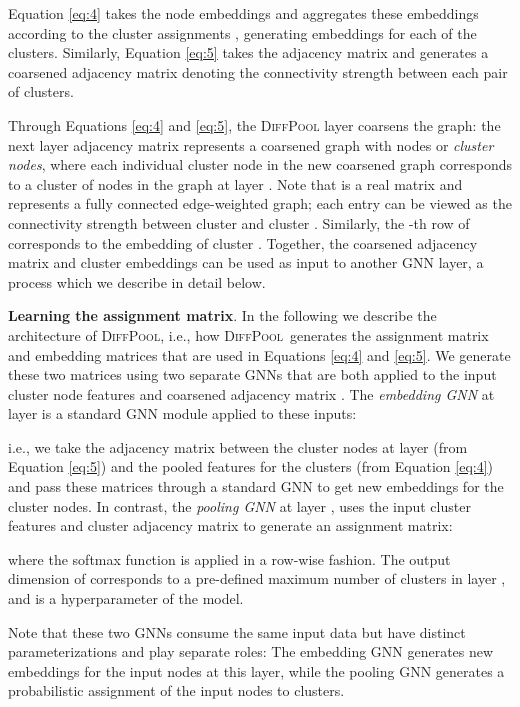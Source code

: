 \documentclass{article}
\newcommand{\xhdr}[1]{{\noindent\bfseries #1}.}
\newcommand{\name}{\textsc{DiffPool}\xspace}
\begin{document}
Equation \eqref{eq:4} takes the node embeddings  and aggregates these embeddings according to the cluster assignments , generating embeddings for each of the  clusters.
Similarly, Equation \eqref{eq:5} takes the adjacency matrix  and generates a coarsened adjacency matrix denoting the connectivity strength between each pair of clusters. 

Through Equations \eqref{eq:4} and \eqref{eq:5}, the \name layer coarsens the graph: the next layer adjacency matrix  represents a coarsened graph with  nodes or {\em cluster nodes}, where each individual cluster node in the new coarsened graph corresponds to a cluster of nodes in the graph at layer .
Note that  is a real matrix and represents a fully connected edge-weighted  graph; each entry  can be viewed as the connectivity strength between cluster  and cluster . 
Similarly, the -th row of  corresponds to the embedding of cluster . 
Together, the coarsened adjacency matrix  and cluster embeddings  can be used as input to another GNN layer, a process which we describe in detail below.  


\xhdr{Learning the assignment matrix}
In the following we describe the architecture of \name, i.e., how \name\ generates the assignment matrix  and embedding matrices  that are used in Equations \eqref{eq:4} and \eqref{eq:5}.
We generate these two matrices using two separate GNNs that are both applied to the input cluster node features  and coarsened adjacency matrix .
The {\em embedding GNN} at layer  is a standard GNN module applied to these inputs:

i.e., we take the adjacency matrix between the cluster nodes at layer  (from Equation \ref{eq:5}) and the pooled features for the clusters (from Equation \ref{eq:4}) and pass these matrices through a standard GNN to get new embeddings  for the cluster nodes. 
In contrast, the {\em pooling GNN} at layer , uses the input cluster features  and cluster adjacency matrix  to generate an assignment matrix:

where the softmax function is applied in a row-wise fashion.
The output dimension of  corresponds to a pre-defined maximum number of clusters in layer , and is a hyperparameter of the model.

Note that these two GNNs consume the same input data but have distinct parameterizations and play separate roles:
The embedding GNN generates new embeddings for the input nodes at this layer, while the pooling GNN generates a probabilistic assignment of the input nodes to  clusters.
\end{document}
